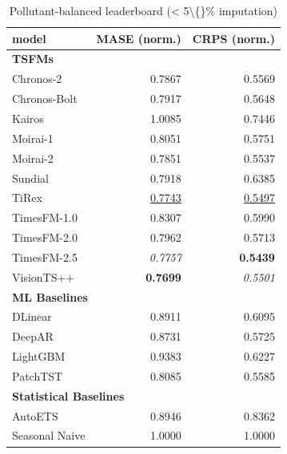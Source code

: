 \begin{table}[H]
\caption{Pollutant-balanced leaderboard (\textless{} 5\textbackslash\{\}\% imputation)}
\centering
\begin{small}
\begin{tabular}{lrr}
\toprule
model & MASE (norm.) & CRPS (norm.) \\
\midrule
\multicolumn{3}{l}{\textbf{TSFMs}} \\
Chronos-2 & 0.7867 & 0.5569 \\
Chronos-Bolt & 0.7917 & 0.5648 \\
Kairos & 1.0085 & 0.7446 \\
Moirai-1 & 0.8051 & 0.5751 \\
Moirai-2 & 0.7851 & 0.5537 \\
Sundial & 0.7918 & 0.6385 \\
TiRex & \underline{0.7743} & \underline{0.5497} \\
TimesFM-1.0 & 0.8307 & 0.5990 \\
TimesFM-2.0 & 0.7962 & 0.5713 \\
TimesFM-2.5 & \textit{0.7757} & \textbf{0.5439} \\
VisionTS++ & \textbf{0.7699} & \textit{0.5501} \\
\midrule
\multicolumn{3}{l}{\textbf{ML Baselines}} \\
DLinear & 0.8911 & 0.6095 \\
DeepAR & 0.8731 & 0.5725 \\
LightGBM & 0.9383 & 0.6227 \\
PatchTST & 0.8085 & 0.5585 \\
\midrule
\multicolumn{3}{l}{\textbf{Statistical Baselines}} \\
AutoETS & 0.8946 & 0.8362 \\
Seasonal Naive & 1.0000 & 1.0000 \\
\bottomrule
\end{tabular}
\end{small}
\end{table}